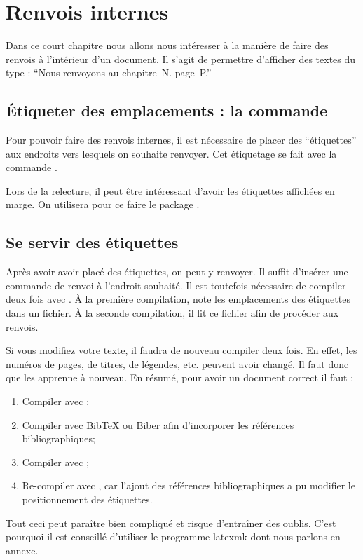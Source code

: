 \chapter{Renvois internes}\label{label}

\begin{intro}
Dans ce court chapitre nous allons nous intéresser à la manière de faire des renvois à l'intérieur d'un document.
Il s'agit de permettre d'afficher des textes du type : \enquote{Nous renvoyons au chapitre~N. page~P.}
\end{intro}

\section{Étiqueter des  emplacements : la commande }

Pour pouvoir faire des renvois internes, il est nécessaire de placer des \enquote{étiquettes} aux endroits vers lesquels on souhaite renvoyer.
Cet étiquetage  se fait avec la commande .

\begin{plusloins}
Lors de la relecture, il peut être intéressant d'avoir les étiquettes affichées en marge. On utilisera pour ce faire le package .
\end{plusloins}

\section{Se servir des étiquettes}

Après avoir avoir placé des étiquettes, on peut y renvoyer. 
Il suffit d'insérer une commande de renvoi à l'endroit souhaité. 
Il est toutefois nécessaire de compiler deux fois avec \XeLaTeX.
À la première compilation,   \XeLaTeX
note les emplacements des étiquettes dans un fichier. À la seconde compilation, il lit ce fichier afin de procéder aux renvois. 

\begin{attention}
    Si vous modifiez votre texte, il faudra de nouveau compiler deux fois. En effet, les numéros de pages, de titres, de légendes, etc. peuvent avoir changé. Il faut donc  que \XeLaTeX{} les apprenne à nouveau. En résumé, pour avoir un document correct il faut :
    \begin{enumerate}
        \item Compiler avec \XeLaTeX{};
        \item Compiler avec BibTeX ou Biber afin d'incorporer les références bibliographiques;
        \item Compiler avec \XeLaTeX{};
        \item Re-compiler avec \XeLaTeX{}, car l'ajout des références bibliographiques a pu modifier le positionnement des étiquettes.
    \end{enumerate}
    
    Tout ceci peut paraître bien compliqué et risque d'entraîner des oublis. C'est pourquoi il est conseillé d'utiliser le programme latexmk dont nous parlons en annexe.
\end{attention}

